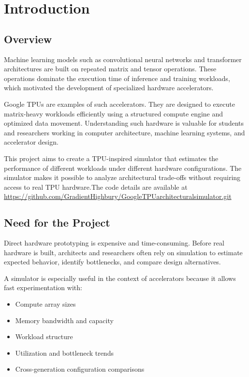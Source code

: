 \documentclass[12pt,a4paper]{article}
\begin{document}
	\clearpage

	
	
	\section{Introduction}
	
	\subsection{Overview}
	Machine learning models such as convolutional neural networks and transformer architectures are built on repeated matrix and tensor operations. These operations dominate the execution time of inference and training workloads, which motivated the development of specialized hardware accelerators.
	
	Google TPUs are examples of such accelerators. They are designed to execute matrix-heavy workloads efficiently using a structured compute engine and optimized data movement. Understanding such hardware is valuable for students and researchers working in computer architecture, machine learning systems, and accelerator design.
	
	This project aims to create a TPU-inspired simulator that estimates the performance of different workloads under different hardware configurations. The simulator makes it possible to analyze architectural trade-offs without requiring access to real TPU hardware.The code details are available at \\ \url{https://github.com/GradientHighbury/GoogleTPUarchitecturalsimulator.git}
	
	\subsection{Need for the Project}
	Direct hardware prototyping is expensive and time-consuming. Before real hardware is built, architects and researchers often rely on simulation to estimate expected behavior, identify bottlenecks, and compare design alternatives.
	
	A simulator is especially useful in the context of accelerators because it allows fast experimentation with:
	\begin{itemize}[itemsep=2pt, topsep=4pt]
		\item Compute array sizes
		\item Memory bandwidth and capacity
		\item Workload structure
		\item Utilization and bottleneck trends
		\item Cross-generation configuration comparisons
	\end{itemize}
	
\end{document}
